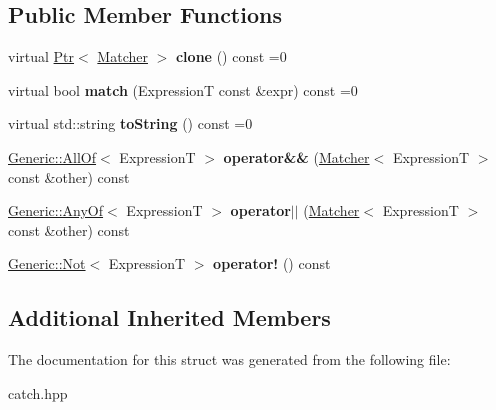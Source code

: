 \subsection*{Public Member Functions}
\begin{DoxyCompactItemize}
\item 
virtual \hyperlink{classCatch_1_1Ptr}{Ptr}$<$ \hyperlink{structCatch_1_1Matchers_1_1Impl_1_1Matcher}{Matcher} $>$ {\bfseries clone} () const  =0\hypertarget{structCatch_1_1Matchers_1_1Impl_1_1Matcher_a72c896b9afa03c7e6ac19a0c1d5a634b}{}\label{structCatch_1_1Matchers_1_1Impl_1_1Matcher_a72c896b9afa03c7e6ac19a0c1d5a634b}

\item 
virtual bool {\bfseries match} (ExpressionT const \&expr) const  =0\hypertarget{structCatch_1_1Matchers_1_1Impl_1_1Matcher_a5c00e663b7b83cbf2e4b3d13d9193309}{}\label{structCatch_1_1Matchers_1_1Impl_1_1Matcher_a5c00e663b7b83cbf2e4b3d13d9193309}

\item 
virtual std\+::string {\bfseries to\+String} () const  =0\hypertarget{structCatch_1_1Matchers_1_1Impl_1_1Matcher_afd2469dc5c1869d67d4ad00d3b6388eb}{}\label{structCatch_1_1Matchers_1_1Impl_1_1Matcher_afd2469dc5c1869d67d4ad00d3b6388eb}

\item 
\hyperlink{classCatch_1_1Matchers_1_1Impl_1_1Generic_1_1AllOf}{Generic\+::\+All\+Of}$<$ ExpressionT $>$ {\bfseries operator\&\&} (\hyperlink{structCatch_1_1Matchers_1_1Impl_1_1Matcher}{Matcher}$<$ ExpressionT $>$ const \&other) const \hypertarget{structCatch_1_1Matchers_1_1Impl_1_1Matcher_a1d3b73f684611a6a71396caf74427287}{}\label{structCatch_1_1Matchers_1_1Impl_1_1Matcher_a1d3b73f684611a6a71396caf74427287}

\item 
\hyperlink{classCatch_1_1Matchers_1_1Impl_1_1Generic_1_1AnyOf}{Generic\+::\+Any\+Of}$<$ ExpressionT $>$ {\bfseries operator$\vert$$\vert$} (\hyperlink{structCatch_1_1Matchers_1_1Impl_1_1Matcher}{Matcher}$<$ ExpressionT $>$ const \&other) const \hypertarget{structCatch_1_1Matchers_1_1Impl_1_1Matcher_a2e163b264811ba76638469b537467f9e}{}\label{structCatch_1_1Matchers_1_1Impl_1_1Matcher_a2e163b264811ba76638469b537467f9e}

\item 
\hyperlink{classCatch_1_1Matchers_1_1Impl_1_1Generic_1_1Not}{Generic\+::\+Not}$<$ ExpressionT $>$ {\bfseries operator!} () const \hypertarget{structCatch_1_1Matchers_1_1Impl_1_1Matcher_a534857633dde84924993b674cb248c8f}{}\label{structCatch_1_1Matchers_1_1Impl_1_1Matcher_a534857633dde84924993b674cb248c8f}

\end{DoxyCompactItemize}
\subsection*{Additional Inherited Members}


The documentation for this struct was generated from the following file\+:\begin{DoxyCompactItemize}
\item 
catch.\+hpp\end{DoxyCompactItemize}
